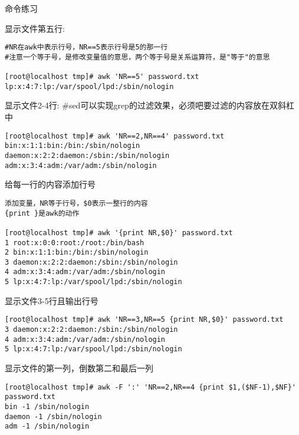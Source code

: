\begin{ascolorbox10}{命令练习}
	\begin{ascboxJ}{显示文件第五行:}
		\begin{lstlisting}[style=linux]
#NR在awk中表示行号，NR==5表示行号是5的那一行
#注意一个等于号，是修改变量值的意思，两个等于号是关系运算符，是"等于"的意思

[root@localhost tmp]# awk 'NR==5' password.txt
lp:x:4:7:lp:/var/spool/lpd:/sbin/nologin
		\end{lstlisting}
	\end{ascboxJ}
	\begin{ascboxJ}{显示文件2-4行:}
		\#sed可以实现grep的过滤效果，必须吧要过滤的内容放在双斜杠中
		\begin{lstlisting}[style=linux]
[root@localhost tmp]# awk 'NR==2,NR==4' password.txt
bin:x:1:1:bin:/bin:/sbin/nologin
daemon:x:2:2:daemon:/sbin:/sbin/nologin
adm:x:3:4:adm:/var/adm:/sbin/nologin
		\end{lstlisting}
	\end{ascboxJ}
	\begin{ascboxJ}{给每一行的内容添加行号}
		\begin{lstlisting}[style=linux]
添加变量，NR等于行号，$0表示一整行的内容
{print }是awk的动作

[root@localhost tmp]# awk '{print NR,$0}' password.txt
1 root:x:0:0:root:/root:/bin/bash
2 bin:x:1:1:bin:/bin:/sbin/nologin
3 daemon:x:2:2:daemon:/sbin:/sbin/nologin
4 adm:x:3:4:adm:/var/adm:/sbin/nologin
5 lp:x:4:7:lp:/var/spool/lpd:/sbin/nologin
		\end{lstlisting}
	\end{ascboxJ}
	\begin{ascboxJ}{显示文件3-5行且输出行号}
		\begin{lstlisting}[style=linux]
[root@localhost tmp]# awk 'NR==3,NR==5 {print NR,$0}' password.txt
3 daemon:x:2:2:daemon:/sbin:/sbin/nologin
4 adm:x:3:4:adm:/var/adm:/sbin/nologin
5 lp:x:4:7:lp:/var/spool/lpd:/sbin/nologin
		\end{lstlisting}
	\end{ascboxJ}
	\begin{ascboxJ}{显示文件的第一列，倒数第二和最后一列}
		\begin{lstlisting}[style=linux]
[root@localhost tmp]# awk -F ':' 'NR==2,NR==4 {print $1,($NF-1),$NF}' password.txt
bin -1 /sbin/nologin
daemon -1 /sbin/nologin
adm -1 /sbin/nologin
		\end{lstlisting}
	\end{ascboxJ}
\end{ascolorbox10}



